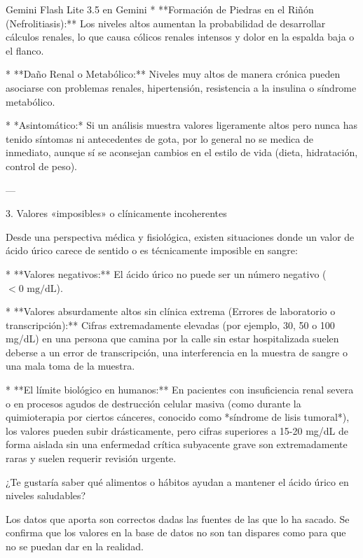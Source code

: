 \documentclass[12pt,a4paper,oneside]{book}
\begin{document}
\begin{iaresp}{Gemini Flash Lite 3.5 en Gemini}
* **Formación de Piedras en el Riñón (Nefrolitiasis):** Los niveles altos aumentan la probabilidad de desarrollar cálculos renales, lo que causa cólicos renales intensos y dolor en la espalda baja o el flanco.

* **Daño Renal o Metabólico:** Niveles muy altos de manera crónica pueden asociarse con problemas renales, hipertensión, resistencia a la insulina o síndrome metabólico.

* *Asintomático:* Si un análisis muestra valores ligeramente altos pero nunca has tenido síntomas ni antecedentes de gota, por lo general no se medica de inmediato, aunque sí se aconsejan cambios en el estilo de vida (dieta, hidratación, control de peso).

---

3. Valores «imposibles» o clínicamente incoherentes

Desde una perspectiva médica y fisiológica, existen situaciones donde un valor de ácido úrico carece de sentido o es técnicamente imposible en sangre:

* **Valores negativos:** El ácido úrico no puede ser un número negativo ($< 0 \text{ mg/dL}$).

* **Valores absurdamente altos sin clínica extrema (Errores de laboratorio o transcripción):** Cifras extremadamente elevadas (por ejemplo, 30, 50 o 100 mg/dL) en una persona que camina por la calle sin estar hospitalizada suelen deberse a un error de transcripción, una interferencia en la muestra de sangre o una mala toma de la muestra.

* **El límite biológico en humanos:** En pacientes con insuficiencia renal severa o en procesos agudos de destrucción celular masiva (como durante la quimioterapia por ciertos cánceres, conocido como *síndrome de lisis tumoral*), los valores pueden subir drásticamente, pero cifras superiores a 15-20 mg/dL de forma aislada sin una enfermedad crítica subyacente grave son extremadamente raras y suelen requerir revisión urgente.

¿Te gustaría saber qué alimentos o hábitos ayudan a mantener el ácido úrico en niveles saludables?
\end{iaresp}
\begin{iaanalisis}
Los datos que aporta son correctos dadas las fuentes de las que lo ha sacado. Se confirma que los valores en la base de datos no son tan dispares como para que no se puedan dar en la realidad.
\end{iaanalisis}
\end{document}
